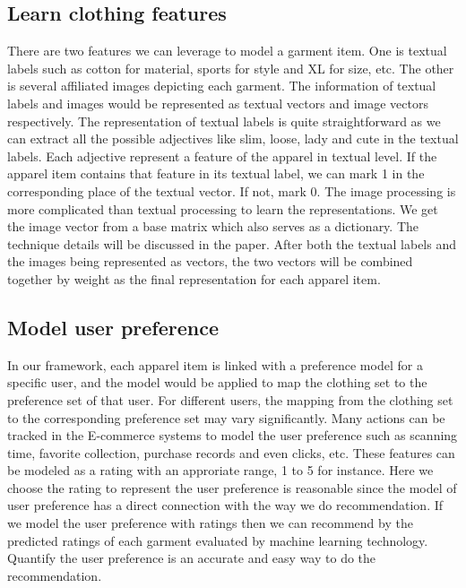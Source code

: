 \subsection{Learn clothing features}
There are two features we can leverage to model a garment item. One is textual labels such as cotton for material, sports for style and XL for size, etc. The other is several affiliated images depicting each garment. The information of textual labels and images would be represented as textual vectors and image vectors respectively. The representation of textual labels is quite straightforward as we can extract all the possible adjectives like slim, loose, lady and cute in the textual
labels. Each adjective represent a feature of the apparel in textual level. If the apparel item contains that feature in its textual label, we can mark 1 in the corresponding place of the textual vector. If not, mark 0. The image processing is more complicated than textual processing to learn the representations. We get the image vector from a base matrix which also serves as a dictionary. The technique details will be discussed in the paper. After both the textual labels
and the images being represented as vectors, the two vectors will be combined together by weight as the final representation for each apparel item.

\subsection{Model user preference}
In our framework, each apparel item is linked with a preference model for a specific user, and the model would be applied to map the clothing set to the preference set of that user. For different users, the mapping from the clothing set to the corresponding preference set may vary significantly. Many actions can be tracked in the E-commerce systems to model the user preference such as scanning time, favorite collection, purchase records and even clicks, etc. These features can be modeled
as a rating with an approriate range, 1 to 5 for instance. Here we choose the rating to represent the user preference is reasonable since the model of user preference has a direct connection with the way we do recommendation. If we model the user preference with ratings then we can recommend by the predicted ratings of each garment evaluated by machine learning technology. Quantify the user preference is an accurate and easy way to do the recommendation. 

